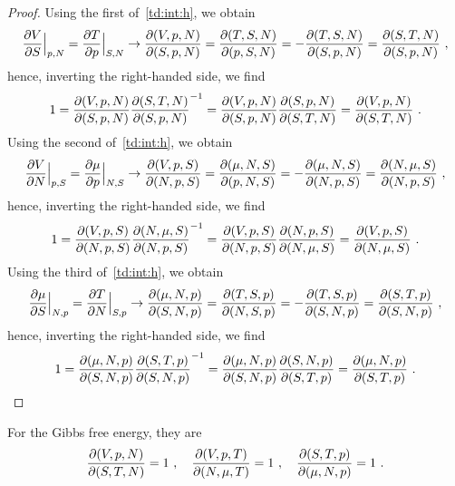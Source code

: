     \begin{proof}
        Using the first of~\eqref{td:int:h}, we obtain
        \begin{equation*}
            \frac{\partial V}{\partial S} \Big \vert_{p, N} = \frac{\partial T}{\partial p} \Big \vert_{S, N} \rightarrow \frac{\partial(V, p, N)}{\partial(S, p, N)} = \frac{\partial(T, S, N)}{\partial(p, S, N)} = - \frac{\partial(T, S, N)}{\partial(S, p, N)} = \frac{\partial(S, T, N)}{\partial(S, p, N)} ~,
        \end{equation*} 
        hence, inverting the right-handed side, we find
        \begin{equation*}
            1 = \frac{\partial(V, p, N)}{\partial(S, p, N)} \frac{\partial(S, T, N)}{\partial(S, p, N)}^{-1} = \frac{\partial(V, p, N)}{\partial(S, p, N)} \frac{\partial(S, p, N)}{\partial(S, T, N)} = \frac{\partial(V, p, N)}{\partial(S, T, N)} ~.
        \end{equation*} 
        Using the second of~\eqref{td:int:h}, we obtain
        \begin{equation*}
            \frac{\partial V}{\partial N} \Big \vert_{p, S} = \frac{\partial\mu}{\partial p} \Big \vert_{N, S} \rightarrow \frac{\partial(V, p, S)}{\partial(N, p, S)} = \frac{\partial(\mu, N, S)}{\partial(p, N, S)} = - \frac{\partial(\mu, N, S)}{\partial(N, p, S)} = \frac{\partial(N, \mu, S)}{\partial(N, p, S)} ~,
        \end{equation*} 
        hence, inverting the right-handed side, we find
        \begin{equation*}
            1 = \frac{\partial(V, p, S)}{\partial(N, p, S)} \frac{\partial(N, \mu, S)}{\partial(N, p, S)}^{-1} = \frac{\partial(V, p, S)}{\partial(N, p, S)} \frac{\partial(N, p, S)}{\partial(N, \mu, S)} = \frac{\partial(V, p, S)}{\partial(N, \mu, S)} ~.
        \end{equation*} 
        Using the third of~\eqref{td:int:h}, we obtain
        \begin{equation*}
            \frac{\partial\mu}{\partial S} \Big \vert_{N, p} = \frac{\partial T}{\partial N} \Big \vert_{S, p} \rightarrow \frac{\partial(\mu, N, p)}{\partial(S, N, p)} = \frac{\partial(T, S, p)}{\partial(N, S, p)} = - \frac{\partial(T, S, p)}{\partial(S, N,p)} = \frac{\partial(S, T, p)}{\partial(S, N, p)}~,
        \end{equation*} 
        hence, inverting the right-handed side, we find
        \begin{equation*}
            1 = \frac{\partial(\mu, N, p)}{\partial(S, N, p)} \frac{\partial(S, T, p)}{\partial(S, N, p)}^{-1} = \frac{\partial(\mu, N, p)}{\partial(S, N, p)} \frac{\partial(S, N, p)}{\partial(S, T, p)} = \frac{\partial(\mu, N, p)}{\partial(S, T, p)} ~.
        \end{equation*} 
    \end{proof}
    For the Gibbs free energy, they are 
    \begin{equation*}
        \frac{\partial(V, p, N)}{\partial(S, T, N)} = 1 ~, \quad \frac{\partial(V, p, T)}{\partial(N, \mu, T)} = 1 ~, \quad \frac{\partial(S, T, p)}{\partial(\mu, N, p)} = 1 ~.
    \end{equation*}
